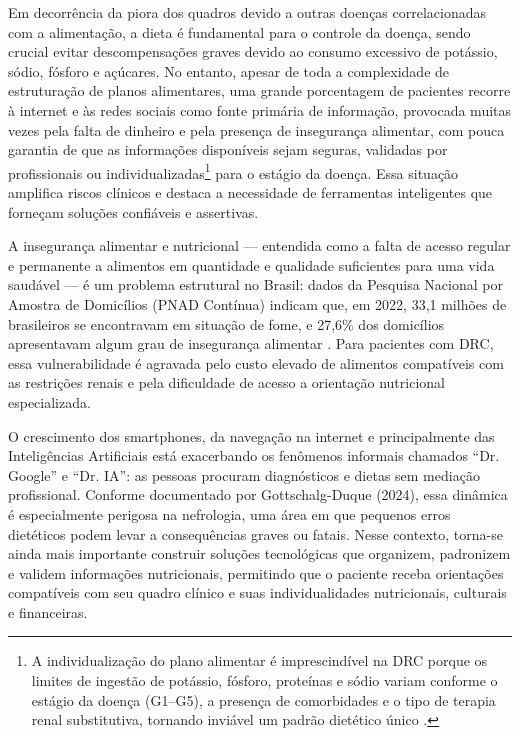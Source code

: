 \documentclass[12pt, a4paper, twocolumn]{article}
\begin{document}
Em decorrência da piora dos quadros devido a outras doenças correlacionadas com a alimentação, a dieta é fundamental para o controle da doença, sendo crucial evitar descompensações graves devido ao consumo excessivo de potássio, sódio, fósforo e açúcares. No entanto, apesar de toda a complexidade de estruturação de planos alimentares, uma grande porcentagem de pacientes recorre à internet e às redes sociais como fonte primária de informação, provocada muitas vezes pela falta de dinheiro e pela presença de insegurança alimentar, com pouca garantia de que as informações disponíveis sejam seguras, validadas por profissionais ou individualizadas\footnote{A individualização do plano alimentar é imprescindível na DRC porque os limites de ingestão de potássio, fósforo, proteínas e sódio variam conforme o estágio da doença (G1--G5), a presença de comorbidades e o tipo de terapia renal substitutiva, tornando inviável um padrão dietético único \cite{vasconcelos2021,kdigo2024}.} para o estágio da doença. Essa situação amplifica riscos clínicos e destaca a necessidade de ferramentas inteligentes que forneçam soluções confiáveis e assertivas.

A insegurança alimentar e nutricional --- entendida como a falta de acesso regular e permanente a alimentos em quantidade e qualidade suficientes para uma vida saudável --- é um problema estrutural no Brasil: dados da Pesquisa Nacional por Amostra de Domicílios (PNAD Contínua) indicam que, em 2022, 33,1 milhões de brasileiros se encontravam em situação de fome, e 27,6\% dos domicílios apresentavam algum grau de insegurança alimentar \cite{ibge2023}. Para pacientes com DRC, essa vulnerabilidade é agravada pelo custo elevado de alimentos compatíveis com as restrições renais e pela dificuldade de acesso a orientação nutricional especializada.

O crescimento dos smartphones, da navegação na internet e principalmente das Inteligências Artificiais está exacerbando os fenômenos informais chamados ``Dr. Google'' e ``Dr. IA'': as pessoas procuram diagnósticos e dietas sem mediação profissional. Conforme documentado por Gottschalg-Duque (2024)\cite{posdoc}, essa dinâmica é especialmente perigosa na nefrologia, uma área em que pequenos erros dietéticos podem levar a consequências graves ou fatais. Nesse contexto, torna-se ainda mais importante construir soluções tecnológicas que organizem, padronizem e validem informações nutricionais, permitindo que o paciente receba orientações compatíveis com seu quadro clínico e suas individualidades nutricionais, culturais e financeiras.
\end{document}
